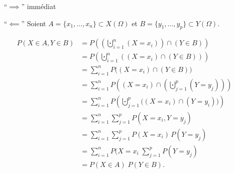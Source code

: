 \begin{prv}
	\begin{itemize}
		\item[``$\implies$''] immédiat
		\item[``$\impliedby$''] Soient $A = \{x_1,\ldots,x_n\} \subset X(\Omega)$ et $B = \{y_1,\ldots,y_p\} \subset Y(\Omega)$.

			\begin{align*}
				P(X \in A,Y\in B) &= P \left( \left( \bigcupdot_{i=1}^n (X = x_i) \right) \cap (Y \in B) \right)\\
				&= P\left( \bigcupdot_{i=1}^n\left( (X=x_i)\cap (Y \in B) \right) \right) \\
				&= \sum_{i=1}^n P\big((X = x_i)\cap (Y \in B)\big) \\
				&= \sum_{i=1}^n P\left( (X =x_i) \cap \left( \bigcupdot_{j=1}^p(Y = y_j) \right) \right) \\
				&= \sum_{i=1}^n P\left( \bigcupdot_{j=1}^p \big((X=x_i)\cap (Y=y_i)\big) \right) \\
				&= \sum_{i=1}^n \sum_{j=1}^p P(X = x_i,Y=y_j) \\
				&= \sum_{i=1}^n \sum_{j=1}^p P(X=x_i)\,P(Y=y_j) \\
				&= \sum_{i=1}^nP(X=x_i\;\sum_{j=1}^p P(Y = y_j) \\
				&= P(X \in A)\;P(Y \in B). \\
			\end{align*}
	\end{itemize}
\end{prv}

